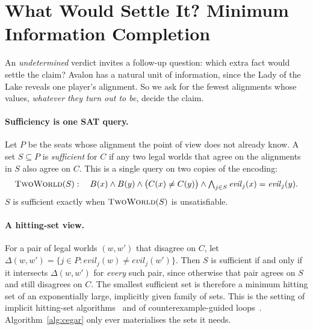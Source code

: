 \documentclass[runningheads]{llncs}
\newcommand{\evil}{\mathit{evil}}
\newcommand{\vd}[1]{\emph{#1}}             %
\begin{document}
\section{What Would Settle It? Minimum Information Completion}\label{sec:reveal}
An \vd{undetermined} verdict invites a follow-up question: which extra fact would settle the claim? Avalon has a
natural unit of information, since the Lady of the Lake reveals one player's alignment. So we ask for the fewest
alignments whose values, \emph{whatever they turn out to be}, decide the claim.

\paragraph{Sufficiency is one SAT query.}
Let $P$ be the seats whose alignment the point of view does not already know. A set $S\subseteq P$ is
\emph{sufficient} for $C$ if any two legal worlds that agree on the alignments in $S$ also agree on $C$. This is a
single query on two copies of the encoding:
\[
\textsc{TwoWorld}(S):\quad B(x)\wedge B(y)\wedge \big(C(x)\ne C(y)\big)\wedge \textstyle\bigwedge_{j\in S}\evil_j(x)=\evil_j(y).
\]
$S$ is sufficient exactly when $\textsc{TwoWorld}(S)$ is unsatisfiable.

\paragraph{A hitting-set view.}
For a pair of legal worlds $(w,w')$ that disagree on $C$, let $\Delta(w,w')=\{j\in P:\evil_j(w)\ne\evil_j(w')\}$.
Then $S$ is sufficient if and only if it intersects $\Delta(w,w')$ for \emph{every} such pair, since otherwise that
pair agrees on $S$ and still disagrees on $C$. The smallest sufficient set is therefore a minimum hitting set of an
exponentially large, implicitly given family of sets. This is the setting of implicit hitting-set
algorithms~\cite{davies2011maxsat} and of counterexample-guided loops~\cite{clarke2000cegar,solarlezama2006sketch}.
Algorithm~\ref{alg:cegar} only ever materialises the sets it needs.
\end{document}
